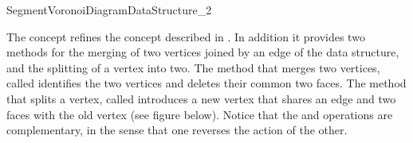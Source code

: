 

\begin{ccRefConcept}{SegmentVoronoiDiagramDataStructure_2}

\ccDefinition

The concept  refines the
concept 
described in . In addition
it provides two methods for the merging of two vertices joined by an
edge of the data structure, and the splitting of a vertex into two.
The method that merges two vertices, called 
identifies the two vertices and deletes their common two faces. The
method that splits a vertex, called  introduces a
new vertex that shares an edge and two faces with the old vertex (see
figure below). Notice that the  and
 operations are complementary, in the sense that one
reverses the action of the other.


\end{ccRefConcept}
